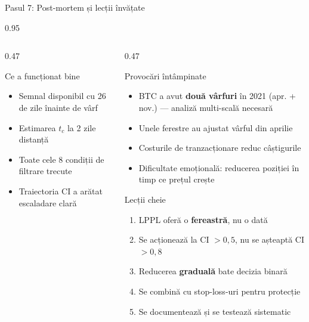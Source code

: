 \documentclass[9pt, aspectratio=169, t]{beamer}
\begin{document}
\begin{frame}{Pasul 7: Post-mortem și lecții învățate}
\begin{cminipage}{0.95\textwidth}
{\begin{columns}[T]
\begin{column}{0.47\textwidth}
            \begin{exampleblock}{Ce a funcționat bine}
                \begin{itemize}\setlength{\itemsep}{0pt}
                    \item Semnal disponibil cu 26 de zile înainte de vârf
                    \item Estimarea $t_c$ la 2 zile distanță
                    \item Toate cele 8 condiții de filtrare trecute
                    \item Traiectoria CI a arătat escaladare clară
                \end{itemize}
            \end{exampleblock}
        \end{column}
        \begin{column}{0.47\textwidth}
            \begin{alertblock}{Provocări întâmpinate}
                \begin{itemize}\setlength{\itemsep}{0pt}
                    \item BTC a avut \textbf{două vârfuri} în 2021 (apr. + nov.) --- analiză multi-scală necesară
                    \item Unele ferestre au ajustat vârful din aprilie
                    \item Costurile de tranzacționare reduc câștigurile
                    \item Dificultate emoțională: reducerea poziției în timp ce prețul crește
                \end{itemize}
            \end{alertblock}

            \begin{block}{Lecții cheie}
                \begin{enumerate}\setlength{\itemsep}{0pt}
                    \item LPPL oferă o \textbf{fereastră}, nu o dată
                    \item Se acționează la CI $> 0{,}5$, nu se așteaptă CI $> 0{,}8$
                    \item Reducerea \textbf{graduală} bate decizia binară
                    \item Se combină cu stop-loss-uri pentru protecție
                    \item Se documentează și se testează sistematic
                \end{enumerate}
            \end{block}
        \end{column}
    \end{columns}
    }
    \end{cminipage}
\end{frame}
\end{document}
